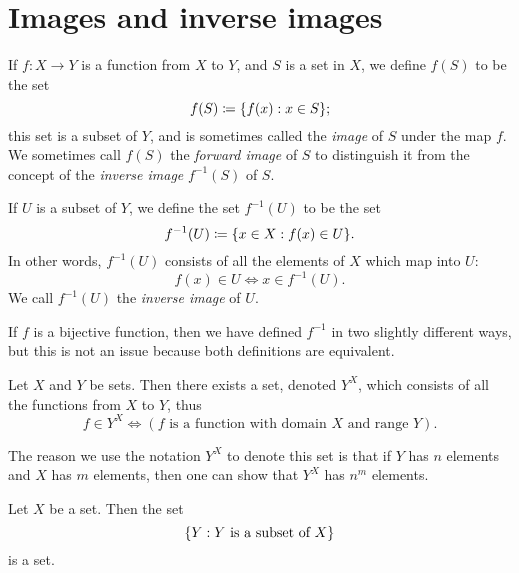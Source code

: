 \section{Images and inverse images}\label{sec:3.4}

\begin{defn}\label{3.4.1}
	If \(f : X \to Y\) is a function from \(X\) to \(Y\), and \(S\) is a set in \(X\), we define \(f(S)\) to be the set
	\[
		f(S) \coloneqq \set{f(x) : x \in S};
	\]
	this set is a subset of \(Y\), and is sometimes called the \emph{image} of \(S\) under the map \(f\).
	We sometimes call \(f(S)\) the \emph{forward image} of \(S\) to distinguish it from the concept of the \emph{inverse image} \(f^{-1}(S)\) of \(S\).
\end{defn}

\setcounter{thm}{3}
\begin{defn}\label{3.4.4}
	If \(U\) is a subset of \(Y\), we define the set \(f^{-1}(U)\) to be the set
	\[
		f^{-1}(U) \coloneqq \set{x \in X : f(x) \in U}.
	\]
	In other words, \(f^{-1}(U)\) consists of all the elements of \(X\) which map into \(U\):
	\[
		f(x) \in U \iff x \in f^{-1}(U).
	\]
	We call \(f^{-1}(U)\) the \emph{inverse image} of \(U\).
\end{defn}

\setcounter{thm}{6}
\begin{rmk}\label{3.4.6}
	If \(f\) is a bijective function, then we have defined \(f^{-1}\) in two slightly different ways, but this is not an issue because both definitions are equivalent.
\end{rmk}

\begin{ax}\label{3.10}
	Let \(X\) and \(Y\) be sets.
	Then there exists a set, denoted \(Y^X\), which consists of all the functions from \(X\) to \(Y\), thus
	\[
		f \in Y^X \iff (f \text{ is a function with domain } X \text{ and range } Y).
	\]
\end{ax}

\begin{note}
	The reason we use the notation \(Y^X\) to denote this set is that if \(Y\) has \(n\) elements and \(X\) has \(m\) elements, then one can show that \(Y^X\) has \(n^m\) elements.
\end{note}

\setcounter{thm}{8}
\begin{lem}\label{3.4.9}
	Let \(X\) be a set.
	Then the set
	\[
		\left\lbrace Y : Y \text{ is a subset of } X\right\rbrace
	\]
	is a set.
\end{lem}

